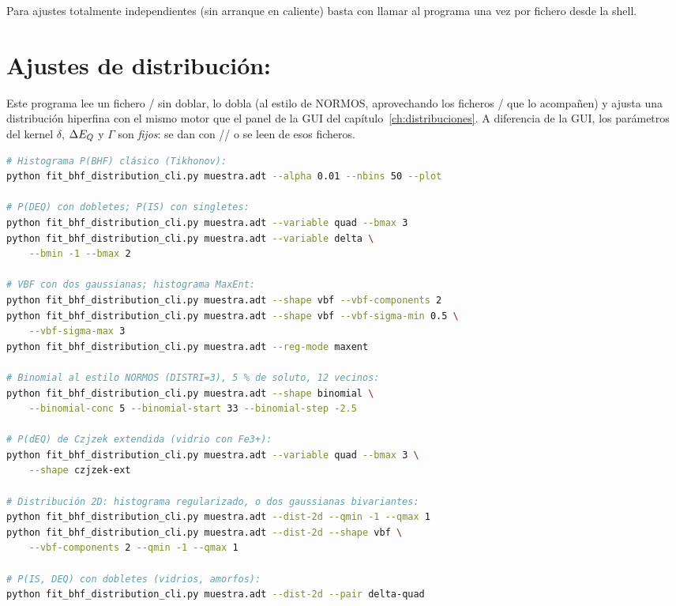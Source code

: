 Para ajustes totalmente independientes (sin arranque en caliente) basta con
llamar al programa una vez por fichero desde la shell.

\section{Ajustes de distribución: }
\label{sec:cli-dist}

Este programa lee un fichero / sin doblar, lo dobla (al
estilo de NORMOS, aprovechando los ficheros / que lo
acompañen) y ajusta una distribución hiperfina con el mismo motor que el panel
de la GUI del capítulo~\ref{ch:distribuciones}. A diferencia de la GUI, los
parámetros del kernel $\delta$, $\Delta E_{Q}$ y $\Gamma$ son \emph{fijos}: se dan con
// o se leen de esos ficheros.

\begin{lstlisting}[language=bash]
# Histograma P(BHF) clásico (Tikhonov):
python fit_bhf_distribution_cli.py muestra.adt --alpha 0.01 --nbins 50 --plot

# P(DEQ) con dobletes; P(IS) con singletes:
python fit_bhf_distribution_cli.py muestra.adt --variable quad --bmax 3
python fit_bhf_distribution_cli.py muestra.adt --variable delta \
    --bmin -1 --bmax 2

# VBF con dos gaussianas; histograma MaxEnt:
python fit_bhf_distribution_cli.py muestra.adt --shape vbf --vbf-components 2
python fit_bhf_distribution_cli.py muestra.adt --shape vbf --vbf-sigma-min 0.5 \
    --vbf-sigma-max 3
python fit_bhf_distribution_cli.py muestra.adt --reg-mode maxent

# Binomial al estilo NORMOS (DISTRI=3), 5 % de soluto, 12 vecinos:
python fit_bhf_distribution_cli.py muestra.adt --shape binomial \
    --binomial-conc 5 --binomial-start 33 --binomial-step -2.5

# P(dEQ) de Czjzek extendida (vidrio con Fe3+):
python fit_bhf_distribution_cli.py muestra.adt --variable quad --bmax 3 \
    --shape czjzek-ext

# Distribución 2D: histograma regularizado, o dos gaussianas bivariantes:
python fit_bhf_distribution_cli.py muestra.adt --dist-2d --qmin -1 --qmax 1
python fit_bhf_distribution_cli.py muestra.adt --dist-2d --shape vbf \
    --vbf-components 2 --qmin -1 --qmax 1

# P(IS, DEQ) con dobletes (vidrios, amorfos):
python fit_bhf_distribution_cli.py muestra.adt --dist-2d --pair delta-quad
\end{lstlisting}

